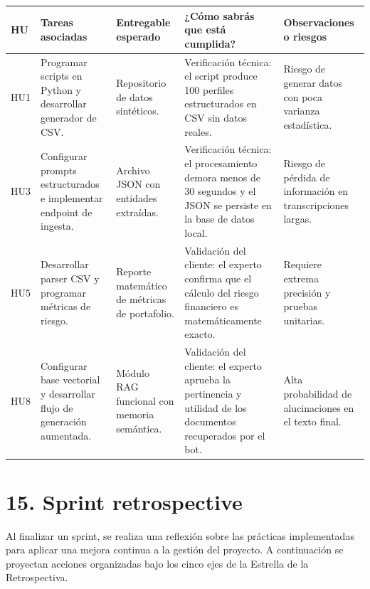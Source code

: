 \documentclass[
11pt, %
]{charter}
\begin{document}
\begin{table}[!ht]
\renewcommand{\arraystretch}{1.5}
\begin{tabular}{|>{\raggedright\arraybackslash}m{2cm}|
                >{\raggedright\arraybackslash}m{3.5cm}|
                >{\raggedright\arraybackslash}m{2.5cm}|
                >{\raggedright\arraybackslash}m{3.5cm}|
                >{\raggedright\arraybackslash}m{2.5cm}|}
\hline
\rowcolor[HTML]{CCCCCC}
\textbf{HU} & \textbf{Tareas asociadas} & \textbf{Entregable esperado} & \textbf{¿Cómo sabrás que está cumplida?} & \textbf{Observaciones o riesgos} \\
\hline
HU1 & Programar scripts en Python y desarrollar generador de CSV. & Repositorio de datos sintéticos. & Verificación técnica: el script produce 100 perfiles estructurados en CSV sin datos reales. & Riesgo de generar datos con poca varianza estadística. \\
\hline
HU3 & Configurar prompts estructurados e implementar endpoint de ingesta. & Archivo JSON con entidades extraídas. & Verificación técnica: el procesamiento demora menos de 30 segundos y el JSON se persiste en la base de datos local. & Riesgo de pérdida de información en transcripciones largas. \\
\hline
HU5 & Desarrollar parser CSV y programar métricas de riesgo. & Reporte matemático de métricas de portafolio. & Validación del cliente: el experto confirma que el cálculo del riesgo financiero es matemáticamente exacto. & Requiere extrema precisión y pruebas unitarias. \\
\hline
HU8 & Configurar base vectorial y desarrollar flujo de generación aumentada. & Módulo RAG funcional con memoria semántica. & Validación del cliente: el experto aprueba la pertinencia y utilidad de los documentos recuperados por el bot. & Alta probabilidad de alucinaciones en el texto final. \\
\hline
\end{tabular}
\end{table}

\clearpage

\section{15. Sprint retrospective}    
\label{sec:sprint_retro}

Al finalizar un sprint, se realiza una reflexión sobre las prácticas implementadas para aplicar una mejora continua a la gestión del proyecto. A continuación se proyectan acciones organizadas bajo los cinco ejes de la Estrella de la Retrospectiva.
\end{document}
